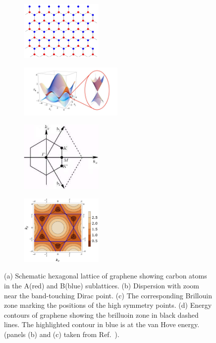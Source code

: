 \begin{figure}[]
	\centering
	\begin{subfigure}{0.5\linewidth}
		\centering
		\includegraphics[width=4cm]{figures/introduction/graphene lattice.png}
            \caption{\centering}
	\end{subfigure}%
        \begin{subfigure}{0.5\linewidth}
		\centering
		\includegraphics[width=5cm]{figures/introduction/bandstructure_graphene.png}
            \caption{\centering}
	\end{subfigure}%
	
 	\centering
	\begin{subfigure}{0.45\linewidth}
		\centering
		\includegraphics[width=4cm]{figures/introduction/brilluoinzonegraphene.png}
            \caption{\centering}
	\end{subfigure}
	\begin{subfigure}{0.45\linewidth}
		\centering
		\includegraphics[width=4cm]{figures/introduction/graphenecontoursv2.pdf}
            \caption{\centering}
	\end{subfigure}

	\caption{(a) Schematic hexagonal lattice of graphene showing carbon atoms in the A(red) and B(blue) sublattices. (b) Dispersion with zoom near the band-touching Dirac point. (c) The corresponding Brillouin zone marking the positions of the high symmetry points. (d) Energy contours of graphene showing the brilluoin zone in black dashed lines. The highlighted contour in blue is at the van Hove energy. (panels (b) and (c) taken from Ref.~\cite{neto2009electronic}).}
	\label{fig:grapheneschematic}
\end{figure}


